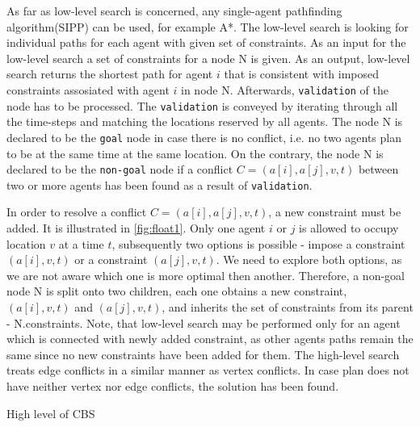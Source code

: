 \documentclass[thesis=B,english]{FITthesis}[2019/12/23]
\begin{document}
As far as low-level search is concerned, any single-agent pathfinding algorithm(SIPP) can be used, for example A*. The low-level search is looking for individual paths for each agent with given set of constraints. As an input for the low-level search a set of constraints for a node N is given. As an output, low-level search returns the shortest path for agent $i$ that is consistent with imposed constraints assosiated with agent $i$ in node N. Afterwards, \verb|validation| of the node has to be processed. The \verb|validation| is conveyed by iterating through all the time-steps and matching the locations reserved by all agents. The node N is declared to be the \verb|goal| node in case there is no conflict, i.e. no two agents plan to be at the same time at the same location. On the contrary, the node N is declared to be the \verb|non-goal| node if a conflict $C = (a[i], a[j], v, t)$  between two or more agents has been found as a result of \verb|validation|.

In order to resolve a conflict $C = (a[i], a[j], v, t)$, a new constraint must be added. It is illustrated in \ref{fig:float1}. Only one agent $i$ or $j$ is allowed to occupy location $v$ at a time $t$, subsequently two options is possible - impose a constraint $(a[i], v, t)$ or a constraint $(a[j], v, t)$. We need to explore both options, as we are not aware which one is more optimal then another. Therefore, a non-goal node N is split onto two children, each one obtains a new constraint, $(a[i], v, t)$ and $(a[j], v, t)$, and inherits the set of constraints from its parent - N.constraints. Note, that low-level search may be performed only for an agent which is connected with newly added constraint, as other agents paths remain the same since no new constraints have been added for them. The high-level search treats edge conflicts in a similar manner as vertex conflicts. In case plan does not have neither vertex nor edge conflicts, the solution has been found.

\begin{algorithm}
\caption{High level of CBS}
\begin{algorithmic}[H]
\STATE {}
 \ENDIF
 \ENDIF   
 \ENDFOR       
\ENDWHILE
\end{algorithmic}
\end{algorithm}
\end{document}
